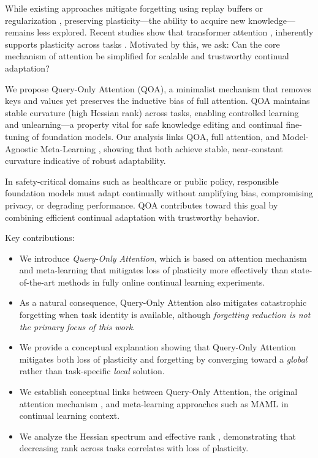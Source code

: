 \documentclass{article}
\begin{document}
While existing approaches mitigate forgetting using replay buffers \citep{zhang2024core} or regularization \citep{kirkpatrick2017overcoming}, preserving plasticity—the ability to acquire new knowledge—remains less explored.
Recent studies show that transformer attention \citep{vaswani2017attention} \citep{olsson2022induction}, \citep{graves2014ntm} inherently supports plasticity across tasks \citep{wang2025replay}. Motivated by this, we ask: Can the core mechanism of attention be simplified for scalable and trustworthy continual adaptation?

We propose Query-Only Attention (QOA), a minimalist mechanism that removes keys and values yet preserves the inductive bias of full attention. QOA maintains stable curvature (high Hessian rank) across tasks, enabling controlled learning and unlearning—a property vital for safe knowledge editing and continual fine-tuning of foundation models.
Our analysis links QOA, full attention, and Model-Agnostic Meta-Learning \citep{finn2017maml}, showing that both achieve stable, near-constant curvature indicative of robust adaptability.

In safety-critical domains such as healthcare or public policy, responsible foundation models must adapt continually without amplifying bias, compromising privacy, or degrading performance. QOA contributes toward this goal by combining efficient continual adaptation with trustworthy behavior.

Key contributions:
\begin{itemize}
\item We introduce \textit{Query-Only Attention}, which is based on attention mechanism and meta-learning that mitigates loss of plasticity more effectively than state-of-the-art methods in fully online continual learning experiments.
\item As a natural consequence, Query-Only Attention also mitigates catastrophic forgetting when task identity is available, although \textit{forgetting reduction is not the primary focus of this work}.
\item We provide a conceptual explanation showing that Query-Only Attention mitigates both loss of plasticity and forgetting by converging toward a \textit{global} rather than task-specific \textit{local} solution.
\item We establish conceptual links between Query-Only Attention, the original attention mechanism \citep{vaswani2017attention}, and meta-learning approaches such as MAML \citep{finn2017maml} in continual learning context.
\item We analyze the Hessian spectrum and effective rank \citep{lewandowski2023curvature}, demonstrating that decreasing rank across tasks correlates with loss of plasticity.
\end{itemize}
\end{document}
